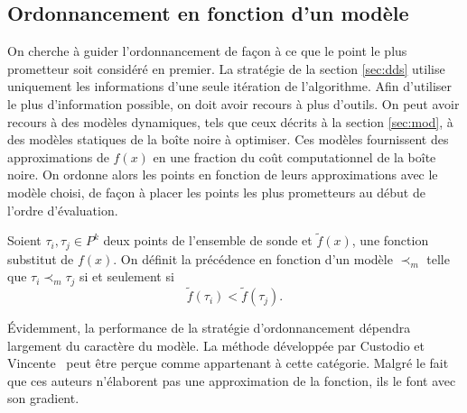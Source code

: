 \subsection{Ordonnancement en fonction d'un modèle}\label{sec:omq}
On cherche à guider l'ordonnancement de façon à ce que le point le plus prometteur soit considéré en premier. La stratégie de la section \ref{sec:dds} utilise uniquement les informations d'une seule itération de l'algorithme. Afin d'utiliser le plus d'information possible, on doit avoir recours à plus d'outils. On peut avoir recours à des modèles dynamiques, tels que ceux décrits à la section \ref{sec:mod}, à des modèles statiques de la boîte noire à optimiser. Ces modèles fournissent des approximations de $f(x)$ en une fraction du coût computationnel de la boîte noire. On ordonne alors les points en fonction de leurs approximations avec le modèle choisi, de façon à placer les points les plus prometteurs au début de l'ordre d'évaluation.
\begin{definition}\label{def:modelordering}
	Soient $\tau_i,\tau_j \in P^k$ deux points de l'ensemble de sonde et $\tilde{f}(x)$, une fonction substitut de $f(x)$. On définit la précédence en fonction d'un modèle $\prec_m$ telle que $\tau_i \prec_m \tau_j$ si et seulement si $$\tilde{f}(\tau_i) < \tilde{f}(\tau_j).$$
\end{definition}
Évidemment, la performance de la stratégie d'ordonnancement dépendra largement du caractère du modèle. La méthode développée par Custodio et Vincente~\cite{CuVi07} peut être perçue comme appartenant à cette catégorie. Malgré le fait que ces auteurs n'élaborent pas une approximation de la fonction, ils le font avec son gradient.  

